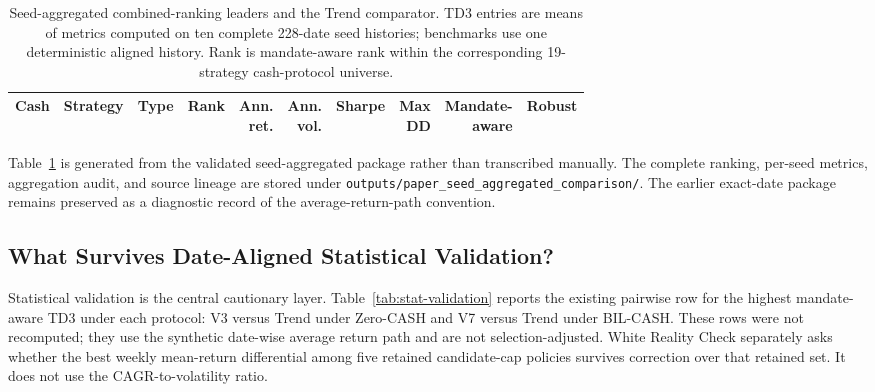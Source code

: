 \documentclass[11pt]{article}
\renewcommand{\arraystretch}{1.18}
\newcommand{\cashzero}{Zero-CASH}
\newcommand{\cashbil}{BIL-CASH}
\begin{document}
\begin{table}[htbp]
\centering
\caption{Seed-aggregated combined-ranking leaders and the Trend comparator. TD3 entries are means of metrics computed on ten complete 228-date seed histories; benchmarks use one deterministic aligned history. Rank is mandate-aware rank within the corresponding 19-strategy cash-protocol universe.}
\label{tab:combined-ranking}
\footnotesize
\setlength{\tabcolsep}{5pt}
\renewcommand{\arraystretch}{1.16}
\begin{adjustbox}{max width=\textwidth}
\begin{tabular}{@{}lllrrrrrrr@{}}
\toprule
Cash & Strategy & Type & Rank & \makecell{Ann.\\ret.} & \makecell{Ann.\\vol.} & Sharpe & \makecell{Max\\DD} & \makecell{Mandate-\\aware} & Robust \\
\midrule

\end{tabular}
\end{adjustbox}
\end{table}

Table~\ref{tab:combined-ranking} is generated from the validated seed-aggregated package rather than transcribed manually. The complete ranking, per-seed metrics, aggregation audit, and source lineage are stored under \texttt{outputs/paper\_seed\_aggregated\_comparison/}. The earlier exact-date package remains preserved as a diagnostic record of the average-return-path convention.

\subsection{What Survives Date-Aligned Statistical Validation?}

Statistical validation is the central cautionary layer. Table~\ref{tab:stat-validation} reports the existing pairwise row for the highest mandate-aware TD3 under each protocol: V3 versus Trend under \cashzero{} and V7 versus Trend under \cashbil{}. These rows were not recomputed; they use the synthetic date-wise average return path and are not selection-adjusted. White Reality Check separately asks whether the best weekly mean-return differential among five retained candidate-cap policies survives correction over that retained set. It does not use the CAGR-to-volatility ratio.
\end{document}

